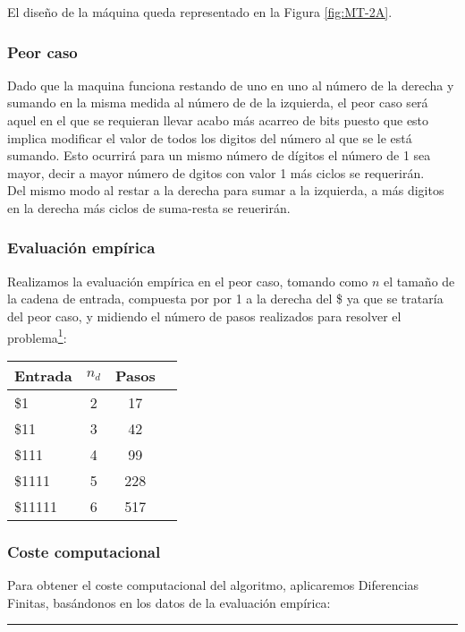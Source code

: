 El diseño de la máquina queda representado en la Figura \ref{fig:MT-2A}.




\subsubsection*{Peor caso}
Dado que la maquina funciona restando de uno en uno al número de la derecha y sumando en la misma medida al número de de la izquierda, el peor caso será aquel en el que se requieran llevar acabo más acarreo de bits puesto que esto implica modificar el valor de todos los digitos del número al que se le está sumando. Esto ocurrirá para un mismo número de dígitos el número de 1 sea mayor, decir a mayor número de dgitos con valor 1 más ciclos se requerirán.\\
Del mismo modo al restar a la derecha para sumar a la izquierda, a más digitos en la derecha más ciclos de suma-resta se reuerirán.

\subsubsection*{Evaluación empírica}
Realizamos la evaluación empírica en el peor caso, tomando como $n$ el tamaño de la cadena de entrada, compuesta por por 1 a la derecha del \$ ya que se trataría del peor caso, y midiendo el número de pasos realizados para resolver el problema\footnote{Los datos se pueden encontrar en \texttt{data/MT-2A.csv}.}:

\begin{table}[h]
    \centering
    \begin{tabular}{lccc}
        Entrada & $n_d$ & Pasos \\
        \hline
        \$1                     & 2  & 17   \\
        \$11                    & 3  & 42   \\
        \$111                   & 4  & 99  \\
        \$1111                  & 5  & 228  \\
        \$11111                 & 6  & 517  \\
    \end{tabular}
\end{table}


\subsubsection*{Coste computacional}
Para obtener el coste computacional del algoritmo, aplicaremos Diferencias Finitas, basándonos en los datos de la evaluación empírica:


